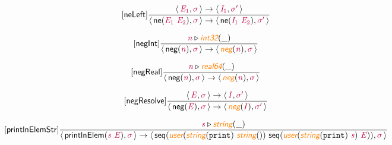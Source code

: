 \documentclass[10pt,leqno,fleqn]{article}
\newcommand{\artVariable}[1]{\mbox{\color{purple}\em #1\/}}
\newcommand{\artConstructor}[1]{\mbox{\sf #1}}
\newcommand{\artCaseInsensitiveLiteral}[1]{\mbox{\tt #1}}
\newcommand{\artSpecial}[1]{\mbox{\color{orange}\sf\em #1}}
\begin{document}
\begin{equation}
\tag*{[\artConstructor{\sf neLeft}]}
\begin{split}\frac{\langle\, \artVariable{E$_{1}$}, \artVariable{$\sigma$}\,\rangle \rightarrow \langle\, \artVariable{I$_{1}$}, \artVariable{$\sigma$\/$^\prime$}\,\rangle }{\langle\, \artConstructor{\sf ne}(\artVariable{E$_{1}$}\ \artVariable{E$_{2}$}), \artVariable{$\sigma$}\,\rangle \rightarrow \langle\, \artConstructor{\sf ne}(\artVariable{I$_{1}$}\ \artVariable{E$_{2}$}), \artVariable{$\sigma$\/$^\prime$}\,\rangle }
\end{split}
\end{equation}

\begin{equation}
\tag*{[\artConstructor{\sf negInt}]}
\begin{split}\frac{ \artVariable{n}\triangleright \artSpecial{int32}(\_) }{\langle\, \artConstructor{\sf neg}(\artVariable{n}), \artVariable{$\sigma$}\,\rangle \rightarrow \langle\, \artSpecial{neg}(\artVariable{n}), \artVariable{$\sigma$}\,\rangle }
\end{split}
\end{equation}

\begin{equation}
\tag*{[\artConstructor{\sf negReal}]}
\begin{split}\frac{ \artVariable{n}\triangleright \artSpecial{real64}(\_) }{\langle\, \artConstructor{\sf neg}(\artVariable{n}), \artVariable{$\sigma$}\,\rangle \rightarrow \langle\, \artSpecial{neg}(\artVariable{n}), \artVariable{$\sigma$}\,\rangle }
\end{split}
\end{equation}

\begin{equation}
\tag*{[\artConstructor{\sf negResolve}]}
\begin{split}\frac{\langle\, \artVariable{E}, \artVariable{$\sigma$}\,\rangle \rightarrow \langle\, \artVariable{I}, \artVariable{$\sigma$\/$^\prime$}\,\rangle }{\langle\, \artConstructor{\sf neg}(\artVariable{E}), \artVariable{$\sigma$}\,\rangle \rightarrow \langle\, \artSpecial{neg}(\artVariable{I}), \artVariable{$\sigma$\/$^\prime$}\,\rangle }
\end{split}
\end{equation}

\begin{equation}
\tag*{[\artConstructor{\sf printlnElemStr}]}
\begin{split}\frac{ \artVariable{s}\triangleright \artSpecial{string}(\_) }{\langle\, \artConstructor{\sf printlnElem}(\artVariable{s}\ \artVariable{E}), \artVariable{$\sigma$}\,\rangle \rightarrow \langle\, \artConstructor{\sf seq}(\artSpecial{user}(\artSpecial{string}(\artCaseInsensitiveLiteral{print})\ \artSpecial{string}(\artCaseInsensitiveLiteral{ }))\ \artConstructor{\sf seq}(\artSpecial{user}(\artSpecial{string}(\artCaseInsensitiveLiteral{print})\ \artVariable{s})\ \artVariable{E})), \artVariable{$\sigma$}\,\rangle }
\end{split}
\end{equation}
\end{document}
